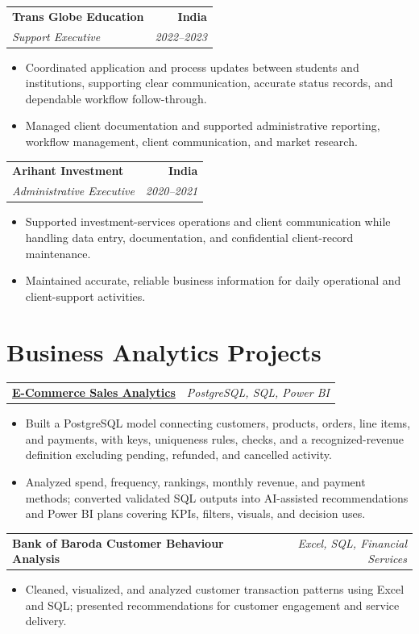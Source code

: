 \documentclass[letterpaper,10pt]{article}
\makeatletter
\newcommand{\role}[4]{%
  \begin{tabularx}{\textwidth}{@{}Xr@{}}
    \textbf{#1} & \textbf{#2} \\
    \textit{#3} & \textit{#4}
  \end{tabularx}\vspace{-1pt}
}
\newcommand{\project}[2]{%
  \begin{tabularx}{\textwidth}{@{}Xr@{}}
    \textbf{#1} & \textit{#2}
  \end{tabularx}\vspace{-1pt}
}
\makeatother
\begin{document}
\role{Trans Globe Education}{India}{Support Executive}{2022--2023}
\begin{itemize}
  \item Coordinated application and process updates between students and institutions, supporting clear communication, accurate status records, and dependable workflow follow-through.
  \item Managed client documentation and supported administrative reporting, workflow management, client communication, and market research.
\end{itemize}
\vspace{0.7pt}

\role{Arihant Investment}{India}{Administrative Executive}{2020--2021}
\begin{itemize}
  \item Supported investment-services operations and client communication while handling data entry, documentation, and confidential client-record maintenance.
  \item Maintained accurate, reliable business information for daily operational and client-support activities.
\end{itemize}

\section{Business Analytics Projects}
\project{\href{https://github.com/jainalimehta/Ecommerce-Sales-Analytics}{E-Commerce Sales Analytics}}{PostgreSQL, SQL, Power BI}
\begin{itemize}
  \item Built a PostgreSQL model connecting customers, products, orders, line items, and payments, with keys, uniqueness rules, checks, and a recognized-revenue definition excluding pending, refunded, and cancelled activity.
  \item Analyzed spend, frequency, rankings, monthly revenue, and payment methods; converted validated SQL outputs into AI-assisted recommendations and Power BI plans covering KPIs, filters, visuals, and decision uses.
\end{itemize}
\vspace{0.7pt}

\project{Bank of Baroda Customer Behaviour Analysis}{Excel, SQL, Financial Services}
\begin{itemize}
  \item Cleaned, visualized, and analyzed customer transaction patterns using Excel and SQL; presented recommendations for customer engagement and service delivery.
\end{itemize}
\vspace{0.7pt}
\end{document}
